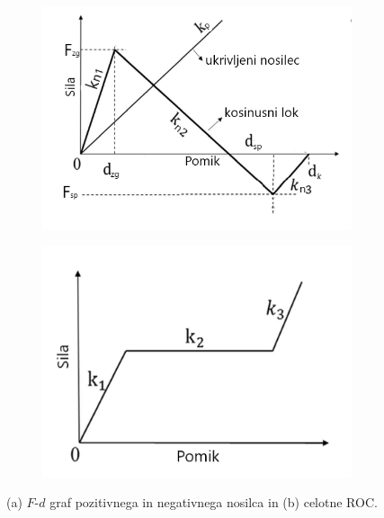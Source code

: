         \begin{figure}[!htb]
                \centering
                \begin{subfigure}{.489\textwidth}
                    \centering
                    \includegraphics[trim=0 0 0 -2cm, clip, width=\linewidth]{Magisterski praktikum/slike/teorija/F-d_graf.png}
                    \caption{}
                    \label{fig:F-d_graf}
                \end{subfigure}%
                \begin{subfigure}{.489\textwidth}
                    \centering
                    \includegraphics[trim=0 0 0 -2cm, clip, width=\linewidth]{Magisterski praktikum/slike/teorija/F-d_graf2.png}
                    \caption{}
                    \label{fig:F-d_graf2}
                \end{subfigure}%
                \caption{(a) $F$-$d$ graf pozitivnega in negativnega nosilca in (b) celotne ROC.}
        \end{figure}
        
